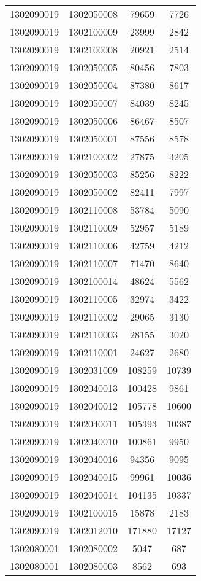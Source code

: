 \begin{longtable}[h]{llcc}
		1302090019 & 1302050008 & 79659 & 7726\\
		1302090019 & 1302100009 & 23999 & 2842\\
		1302090019 & 1302100008 & 20921 & 2514\\
		1302090019 & 1302050005 & 80456 & 7803\\
		1302090019 & 1302050004 & 87380 & 8617\\
		1302090019 & 1302050007 & 84039 & 8245\\
		1302090019 & 1302050006 & 86467 & 8507\\
		1302090019 & 1302050001 & 87556 & 8578\\
		1302090019 & 1302100002 & 27875 & 3205\\
		1302090019 & 1302050003 & 85256 & 8222\\
		1302090019 & 1302050002 & 82411 & 7997\\
		1302090019 & 1302110008 & 53784 & 5090\\
		1302090019 & 1302110009 & 52957 & 5189\\
		1302090019 & 1302110006 & 42759 & 4212\\
		1302090019 & 1302110007 & 71470 & 8640\\
		1302090019 & 1302100014 & 48624 & 5562\\
		1302090019 & 1302110005 & 32974 & 3422\\
		1302090019 & 1302110002 & 29065 & 3130\\
		1302090019 & 1302110003 & 28155 & 3020\\
		1302090019 & 1302110001 & 24627 & 2680\\
		1302090019 & 1302031009 & 108259 & 10739\\
		1302090019 & 1302040013 & 100428 & 9861\\
		1302090019 & 1302040012 & 105778 & 10600\\
		1302090019 & 1302040011 & 105393 & 10387\\
		1302090019 & 1302040010 & 100861 & 9950\\
		1302090019 & 1302040016 & 94356 & 9095\\
		1302090019 & 1302040015 & 99961 & 10036\\
		1302090019 & 1302040014 & 104135 & 10337\\
		1302090019 & 1302100015 & 15878 & 2183\\
		1302090019 & 1302012010 & 171880 & 17127\\
		1302080001 & 1302080002 & 5047 & 687\\
		1302080001 & 1302080003 & 8562 & 693\\

\end{longtable}
